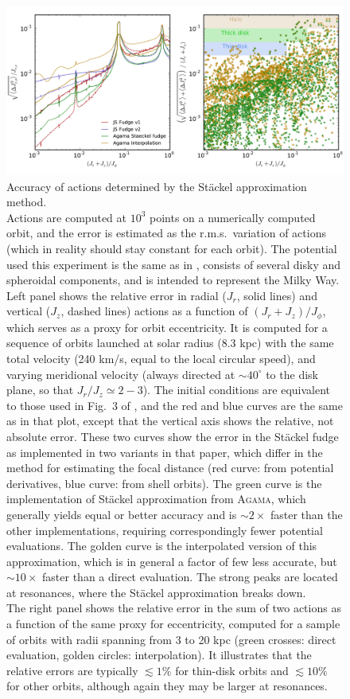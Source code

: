\documentclass[12pt]{article}
\newcommand{\Agama}{\textsc{Agama}\xspace}
\begin{document}
\begin{figure}
\includegraphics[width=16cm]{StaeckelAccuracy.pdf}
\caption{Accuracy of actions determined by the St\"ackel approximation method. \protect\\
Actions are computed at $10^3$ points on a numerically computed orbit, and the error is estimated as the r.m.s.\ variation of actions (which in reality should stay constant for each orbit). The potential used this experiment is the same as in \cite{SandersBinney2016}, consists of several disky and spheroidal components, and is intended to represent the Milky Way. \protect\\
Left panel shows the relative error in radial ($J_r$, solid lines) and vertical ($J_z$, dashed lines) actions as a function of $(J_r+J_z)/J_\phi$, which serves as a proxy for orbit eccentricity. It is computed for a sequence of orbits launched at solar radius (8.3 kpc) with the same total velocity (240 km/s, equal to the local circular speed), and varying meridional velocity (always directed at $\sim40^\circ$ to the disk plane, so that $J_r/J_z\simeq 2-3$). The initial conditions are equivalent to those used in Fig.~3 of \cite{SandersBinney2016}, and the red and blue curves are the same as in that plot, except that the vertical axis shows the relative, not absolute error. These two curves show the error in the St\"ackel fudge as implemented in two variants in that paper, which differ in the method for estimating the focal distance (red curve: from potential derivatives, blue curve: from shell orbits). The green curve is the implementation of St\"ackel approximation from \Agama, which generally yields equal or better accuracy and is $\sim 2\times$ faster than the other implementations, requiring correspondingly fewer potential evaluations. The golden curve is the interpolated version of this approximation, which is in general a factor of few less accurate, but $\sim 10\times$ faster than a direct evaluation. The strong peaks are located at resonances, where the St\"ackel approximation breaks down. \protect\\
The right panel shows the relative error in the sum of two actions as a function of the same proxy for eccentricity, computed for a sample of orbits with radii spanning from 3 to 20 kpc (green crosses: direct evaluation, golden circles: interpolation).
It illustrates that the relative errors are typically $\lesssim 1\%$ for thin-disk orbits and $\lesssim 10\%$ for other orbits, although again they may be larger at resonances. 
}  \label{fig:StaeckelAccuracy}
\end{figure}
\end{document}
